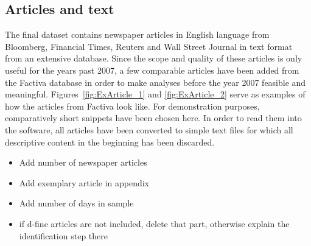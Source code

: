 \subsection{Articles and text}
The final dataset contains newspaper articles in English language from Bloomberg, Financial Times, Reuters and Wall Street Journal in text format from an extensive database. Since the scope and quality of these articles is only useful for the years past 2007, a few comparable articles have been added from the Factiva database in order to make analyses before the year 2007 feasible and meaningful. Figures~\vref{fig:ExArticle_1} and \vref{fig:ExArticle_2} serve as examples of how the articles from Factiva look like. For demonstration purposes, comparatively short snippets have been chosen here. In order to read them into the software, all articles have been converted to simple text files for which all descriptive content in the beginning has been discarded.
%
\begin{itemize}
	\item Add number of newspaper articles
	\item Add exemplary article in appendix
	\item Add number of days in sample
	\item  if d-fine articles are not included, delete that part, otherwise explain the identification step there
\end{itemize}